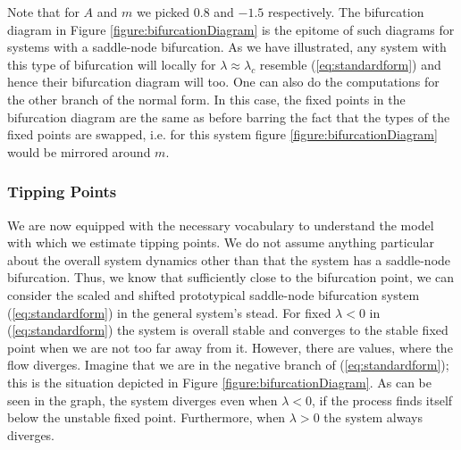 Note that for $A$ and $m$ we picked $0.8$ and $-1.5$ respectively. The bifurcation diagram in Figure \ref{figure:bifurcationDiagram} is the epitome of such diagrams for systems with a saddle-node bifurcation. As we have illustrated, any system with this type of bifurcation will locally for $\lambda \approx \lambda_c$ resemble (\ref{eq:standardform}) and hence their bifurcation diagram will too. One can also do the computations for the other branch of the normal form. In this case, the fixed points in the bifurcation diagram are the same as before barring the fact that the types of the fixed points are swapped, i.e. for this system figure \ref{figure:bifurcationDiagram} would be mirrored around $m$.
\subsubsection{Tipping Points}
We are now equipped with the necessary vocabulary to understand the model with which we estimate tipping points. We do not assume anything particular about the overall system dynamics other than that the system has a saddle-node bifurcation. Thus, we know that sufficiently close to the bifurcation point, we can consider the scaled and shifted prototypical saddle-node bifurcation system (\ref{eq:standardform}) in the general system's stead. For fixed $\lambda < 0$ in (\ref{eq:standardform}) the system is overall stable and converges to the stable fixed point when we are not too far away from it. However, there are values, where the flow  diverges. Imagine that we are in the negative branch of (\ref{eq:standardform}); this is the situation depicted in Figure \ref{figure:bifurcationDiagram}. As can be seen in the graph, the system diverges even when $\lambda<0$, if the process finds itself below the unstable fixed point. Furthermore, when $\lambda>0$ the system always diverges.

